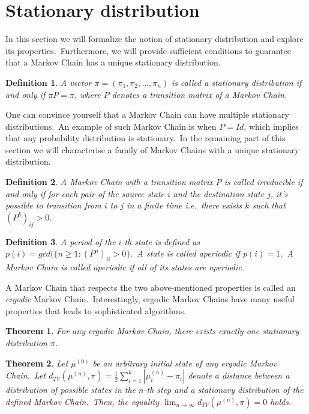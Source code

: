 \documentclass[a4paper, 11pt, onecolumn, openany, titlepage]{report}
\theoremstyle{default_theorem_style}\newtheorem{theorem}{Theorem}
\theoremstyle{default_theorem_style}\newtheorem{definition}{Definition}
\begin{document}
\section{Stationary distribution}

In this section we will formalize the notion of stationary distribution and explore its properties.\ Furthermore,
we will provide sufficient conditions to guarantee that a Markov Chain has a unique stationary distribution.

\begin{definition}
A vector $\pi = (\pi_1, \pi_2, \dots, \pi_n)$ is called a \textit{stationary} distribution if and only if $\pi P = \pi$,
where $P$ denotes a transition matrix of a Markov Chain.
\end{definition}

One can convince yourself that a Markov Chain can have multiple stationary distributions.\ An example of such Markov
Chain is when $P = Id$, which implies that any probability distribution is stationary.\ In the remaining part of this
section we will characterise a family of Markov Chains with a unique stationary distribution.

\begin{definition}
A Markov Chain with a transition matrix $P$ is called \textit{irreducible} if and only if for each pair of the source
state $i$ and the destination state $j$, it's possible to transition from $i$ to $j$ in a finite time i.e.\ there
exists $k$ such that $(P^k)_{ij} > 0$.
\end{definition}

\begin{definition}
A period of the $i$-th state is defined as $p(i) = gcd(\{n \geq 1 : (P^n)_{ii} > 0\}$.\ A state is called
\textit{aperiodic} if $p(i) = 1$.\ A Markov Chain is called aperiodic if all of its states are aperiodic.
\end{definition}

A Markov Chain that respects the two above-mentioned properties is called an \textit{ergodic} Markov
Chain.\ Interestingly, ergodic Markov Chains have many useful properties that leads to sophisticated algorithms.

\begin{theorem}\label{thm:one_stationary}
For any ergodic Markov Chain, there exists exactly one stationary distribution $\pi$.
\end{theorem}

\begin{theorem}\label{thm:converges_to_stationary}
Let $\mu^{(0)}$ be an arbitrary initial state of any ergodic Markov Chain.\ Let
$d_{TV}(\mu^{(n)}, \pi) = \frac{1}{2} \sum_{i = 1}^{k} |\mu_i^{(n)} - \pi_i|$ denote a distance between a
distribution of possible states in the $n$-th step and a stationary distribution of the defined Markov Chain.\ Then,
the equality $\lim_{n \to \infty} d_{TV}(\mu^{(n)}, \pi) = 0$ holds.
\end{theorem}
\end{document}
